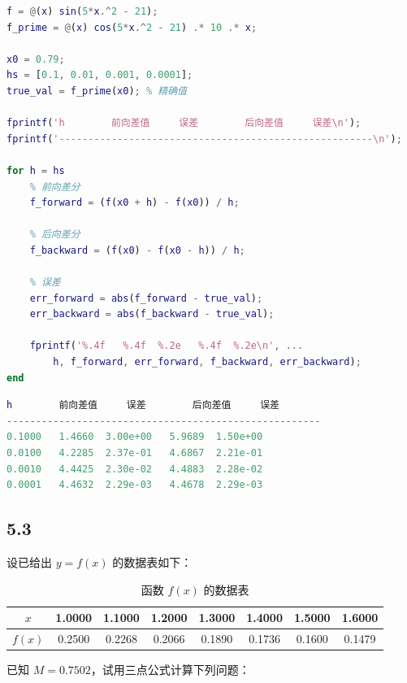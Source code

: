 \begin{lstlisting}[language=matlab]
% 定义函数及其导数
f = @(x) sin(5*x.^2 - 21);
f_prime = @(x) cos(5*x.^2 - 21) .* 10 .* x;

x0 = 0.79;
hs = [0.1, 0.01, 0.001, 0.0001];
true_val = f_prime(x0); % 精确值

fprintf('h        前向差值     误差        后向差值     误差\n');
fprintf('------------------------------------------------------\n');

for h = hs
    % 前向差分
    f_forward = (f(x0 + h) - f(x0)) / h;

    % 后向差分
    f_backward = (f(x0) - f(x0 - h)) / h;

    % 误差
    err_forward = abs(f_forward - true_val);
    err_backward = abs(f_backward - true_val);

    fprintf('%.4f   %.4f  %.2e   %.4f  %.2e\n', ...
        h, f_forward, err_forward, f_backward, err_backward);
end
\end{lstlisting}

\begin{lstlisting}[language=matlab]
h        前向差值     误差        后向差值     误差
------------------------------------------------------
0.1000   1.4660  3.00e+00   5.9689  1.50e+00
0.0100   4.2285  2.37e-01   4.6867  2.21e-01
0.0010   4.4425  2.30e-02   4.4883  2.28e-02
0.0001   4.4632  2.29e-03   4.4678  2.29e-03
\end{lstlisting}


\subsection*{5.3}

设已给出 $y = f(x)$ 的数据表如下：

\begin{table}[h]
\centering
\caption{函数 $f(x)$ 的数据表}
\label{tab:data}
\begin{tabular}{c|ccccccc}
\toprule
$x$       & 1.0000 & 1.1000 & 1.2000 & 1.3000 & 1.4000 & 1.5000 & 1.6000 \\
\midrule
$f(x)$    & 0.2500 & 0.2268 & 0.2066 & 0.1890 & 0.1736 & 0.1600 & 0.1479 \\
\bottomrule
\end{tabular}
\end{table}

已知 $M = 0.7502$，试用三点公式计算下列问题：

